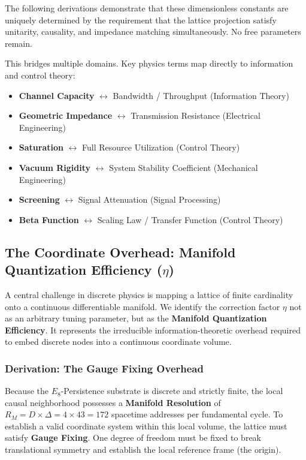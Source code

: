 The following derivations demonstrate that these dimensionless constants are uniquely determined by the requirement that the lattice projection satisfy unitarity, causality, and impedance matching simultaneously. No free parameters remain.

\begin{mdframed}[backgroundcolor=gray!10, linewidth=0pt, skipabove=10pt, skipbelow=10pt]
\small This bridges multiple domains. Key physics terms map directly to information and control theory:
\begin{itemize}
    \item \textbf{Channel Capacity} $\leftrightarrow$ Bandwidth / Throughput (Information Theory)
    \item \textbf{Geometric Impedance} $\leftrightarrow$ Transmission Resistance (Electrical Engineering)
    \item \textbf{Saturation} $\leftrightarrow$ Full Resource Utilization (Control Theory)
    \item \textbf{Vacuum Rigidity} $\leftrightarrow$ System Stability Coefficient (Mechanical Engineering)
    \item \textbf{Screening} $\leftrightarrow$ Signal Attenuation (Signal Processing)
    \item \textbf{Beta Function} $\leftrightarrow$ Scaling Law / Transfer Function (Control Theory)
\end{itemize}
\end{mdframed}

\subsection{The Coordinate Overhead: Manifold Quantization Efficiency (\texorpdfstring{$\eta$}{eta})}

A central challenge in discrete physics is mapping a lattice of finite cardinality onto a continuous differentiable manifold. We identify the correction factor $\eta$ not as an arbitrary tuning parameter, but as the \textbf{Manifold Quantization Efficiency}. It represents the irreducible information-theoretic overhead required to embed discrete nodes into a continuous coordinate volume.

\subsubsection{Derivation: The Gauge Fixing Overhead}

Because the $E_8$-Persistence substrate is discrete and strictly finite, the local causal neighborhood possesses a \textbf{Manifold Resolution} of $R_M = D \times \Delta = 4 \times 43 = 172$ spacetime addresses per fundamental cycle. To establish a valid coordinate system within this local volume, the lattice must satisfy \textbf{Gauge Fixing}. One degree of freedom must be fixed to break translational symmetry and establish the local reference frame (the origin). 

